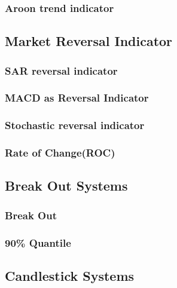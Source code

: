 \subsubsection{Aroon trend indicator}
\label{appA:aroon}


\subsection{Market Reversal Indicator}
\subsubsection{SAR reversal indicator}
\label{appA:sar}


\subsubsection{MACD as Reversal Indicator}
\label{appA:macd_ob}

\subsubsection{Stochastic reversal indicator}
\label{appA:stoch}


\subsubsection{Rate of Change(ROC)}
\label{appA:roc}


\subsection{Break Out Systems}
\subsubsection{Break Out}
\label{appA:bout_sys}


\subsubsection{90\% Quantile}


\label{appA:bout_Quant90}

\subsection{Candlestick Systems}
